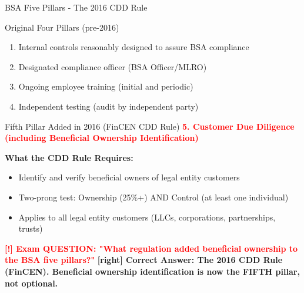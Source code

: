 \documentclass[11pt,a4paper]{beamer}
\newcommand{\redflag}[1]{\textcolor{red}{\textbf{[!] #1}}}
\newcommand{\correct}[1]{\textcolor{green!50!black}{\textbf{[right] #1}}}
\begin{document}
\begin{frame}{BSA Five Pillars - The 2016 CDD Rule}
\begin{block}{Original Four Pillars (pre-2016)}
\begin{enumerate}
\item Internal controls reasonably designed to assure BSA compliance
\item Designated compliance officer (BSA Officer/MLRO)
\item Ongoing employee training (initial and periodic)
\item Independent testing (audit by independent party)
\end{enumerate}
\end{block}
\begin{block}{Fifth Pillar Added in 2016 (FinCEN CDD Rule)}
\textbf{\textcolor{red}{5. Customer Due Diligence (including Beneficial Ownership Identification)}}
\end{block}
\textbf{What the CDD Rule Requires:}
\begin{itemize}
\item Identify and verify beneficial owners of legal entity customers
\item Two-prong test: Ownership (25\%+) AND Control (at least one individual)
\item Applies to all legal entity customers (LLCs, corporations, partnerships, trusts)
\end{itemize}
\redflag{Exam QUESTION: "What regulation added beneficial ownership to the BSA five pillars?"}
\correct{Correct Answer: The 2016 CDD Rule (FinCEN). Beneficial ownership identification is now the FIFTH pillar, not optional.}
\end{frame}

\end{document}
